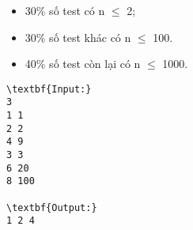 \begin{itemize}
	\item 30\% số test có n  $\le$  2;
	\item 30\% số test khác có n  $\le$  100.
	\item 40\% số test còn lại có n  $\le$  1000.
\end{itemize}
\begin{verbatim}
\textbf{Input:}
3
1 1
2 2
4 9
3 3
6 20
8 100

\textbf{Output:}
1 2 4
\end{verbatim}